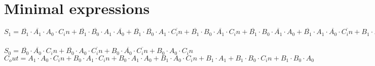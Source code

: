 \documentclass [15pt,a4paper,twoside]{article}
\begin{document}
\section{Minimal expressions}
$S_{1} =  \overline{B_{1}}  \cdot  \overline{A_{1}}  \cdot A_{0} \cdot C_in+ \overline{B_{1}}  \cdot  \overline{B_{0}}  \cdot A_{1} \cdot  \overline{A_{0}} + \overline{B_{1}}  \cdot  \overline{B_{0}}  \cdot A_{1} \cdot  \overline{C_in} + \overline{B_{1}}  \cdot B_{0} \cdot  \overline{A_{1}}  \cdot C_in+ \overline{B_{1}}  \cdot B_{0} \cdot  \overline{A_{1}}  \cdot A_{0}+ \overline{B_{1}}  \cdot A_{1} \cdot  \overline{A_{0}}  \cdot  \overline{C_in} +B_{1} \cdot  \overline{B_{0}}  \cdot  \overline{A_{1}}  \cdot  \overline{A_{0}} +B_{1} \cdot  \overline{B_{0}}  \cdot  \overline{A_{1}}  \cdot  \overline{C_in} +B_{1} \cdot A_{1} \cdot A_{0} \cdot C_in+B_{1} \cdot  \overline{A_{1}}  \cdot  \overline{A_{0}}  \cdot  \overline{C_in} +B_{1} \cdot B_{0} \cdot A_{1} \cdot C_in+B_{1} \cdot B_{0} \cdot A_{1} \cdot A_{0}$~\\
$S_{0} =  \overline{B_{0}}  \cdot  \overline{A_{0}}  \cdot C_in+ \overline{B_{0}}  \cdot A_{0} \cdot  \overline{C_in} +B_{0} \cdot  \overline{A_{0}}  \cdot  \overline{C_in} +B_{0} \cdot A_{0} \cdot C_in$~\\
$C_out = A_{1} \cdot A_{0} \cdot C_in+B_{0} \cdot A_{1} \cdot C_in+B_{0} \cdot A_{1} \cdot A_{0}+B_{1} \cdot A_{0} \cdot C_in+B_{1} \cdot A_{1}+B_{1} \cdot B_{0} \cdot C_in+B_{1} \cdot B_{0} \cdot A_{0}$~\\
\end{document}

